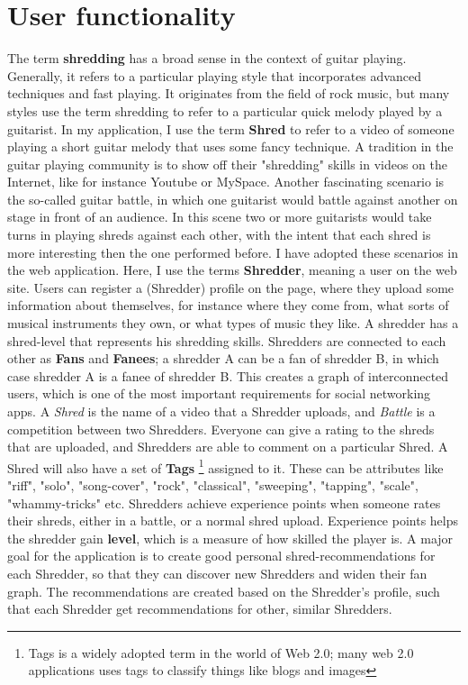\section {User functionality}
The term \textbf{shredding} has a broad sense in the context of guitar playing. Generally, it refers to a particular playing style that incorporates advanced techniques and fast playing. It originates from the field of rock music, but many styles use the term shredding to refer to a particular quick melody played by a guitarist. In my application, I use the term \textbf{Shred} to refer to a video of someone playing a short guitar melody that uses some fancy technique. A tradition in the guitar playing community is to show off their "shredding" skills in videos on the Internet, like for instance Youtube or MySpace. Another fascinating scenario is the so-called guitar battle, in which one guitarist would battle against another on stage in front of an audience. In this scene two or more guitarists would take turns in playing shreds against each other, with the intent that each shred is more interesting then the one performed before. I have adopted these scenarios in the web application. Here, I use the terms \textbf{Shredder}, meaning a user on the web site. Users can register a (Shredder) profile on the page, where they upload some information about themselves, for instance where they come from, what sorts of musical instruments they own, or what types of music they like.  A shredder has a shred-level that represents his shredding skills.  Shredders are connected to each other as \textbf{Fans} and \textbf{Fanees}; a shredder A can be a fan of shredder B, in which case shredder A is a fanee of shredder B. This creates a graph of interconnected users, which is one of the most important requirements for social networking apps.  A \emph{Shred} is the name of a video that a Shredder uploads, and \emph{Battle} is a competition between two Shredders. Everyone can give a rating to the shreds that are uploaded, and Shredders are able to comment on a particular Shred. A Shred will also have a set of \textbf{Tags} \footnote{Tags is a widely adopted term in the world of Web 2.0; many web 2.0 applications uses tags to classify things like blogs and images} assigned to it. These can be attributes like "riff", "solo", "song-cover", "rock", "classical", "sweeping", "tapping", "scale",  "whammy-tricks" etc. Shredders achieve experience points when someone rates their shreds, either in a battle, or a normal shred upload. Experience points helps the shredder gain \textbf{level}, which is a measure of how skilled the player is. A major goal for the application is to create good personal shred-recommendations for each Shredder, so that they can discover new Shredders and widen their fan graph. The recommendations are created based on the Shredder's profile, such that each Shredder get recommendations for other, similar Shredders.
		
